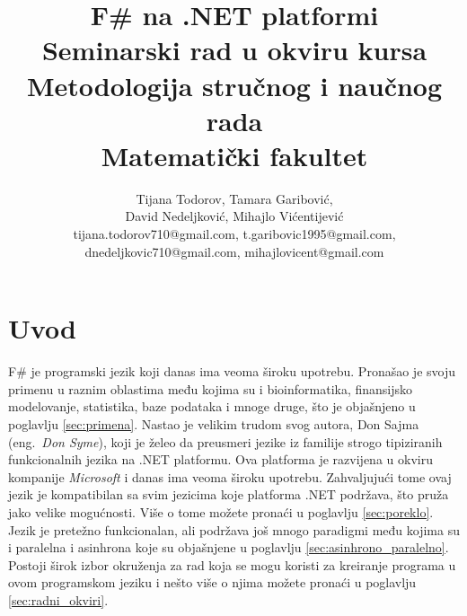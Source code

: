 \documentclass[a4paper]{article}
\begin{document}
\title{F\# na .NET platformi\\ \small{Seminarski rad u okviru kursa\\Metodologija stručnog i naučnog rada\\ Matematički fakultet}}

\author{Tijana Todorov, Tamara Garibović,\\ David Nedeljković, Mihajlo Vićentijević \\ tijana.todorov710@gmail.com, t.garibovic1995@gmail.com, \\ dnedeljkovic710@gmail.com, mihajlovicent@gmail.com}


\maketitle


\tableofcontents
{}
{\setcounter{tocdepth}{1}}

\newpage

\section{Uvod}
\label{sec:uvod}

F\# je programski jezik koji danas ima veoma široku upotrebu. Pronašao je svoju primenu u raznim oblastima među kojima su i bioinformatika, finansijsko modelovanje, statistika, baze podataka i mnoge druge, što je objašnjeno u poglavlju \ref{sec:primena}. Nastao je velikim trudom svog autora, Don Sajma (eng.~{\em Don Syme}), koji je želeo da preusmeri jezike iz familije strogo tipiziranih funkcionalnih jezika na .NET platformu. Ova platforma je razvijena u okviru kompanije {\em Microsoft} i danas ima veoma široku upotrebu. Zahvaljujući tome ovaj jezik je kompatibilan sa svim jezicima koje platforma .NET podržava, što pruža jako velike mogućnosti. Više o tome možete pronaći u poglavlju \ref{sec:poreklo}. Jezik je pretežno funkcionalan, ali podržava još mnogo paradigmi među kojima su i paralelna i asinhrona koje su objašnjene u poglavlju \ref{sec:asinhrono_paralelno}. Postoji širok izbor okruženja za rad koja se mogu koristi za kreiranje programa u ovom programskom jeziku i nešto više o njima možete pronaći u poglavlju \ref{sec:radni_okviri}. 
\end{document}
